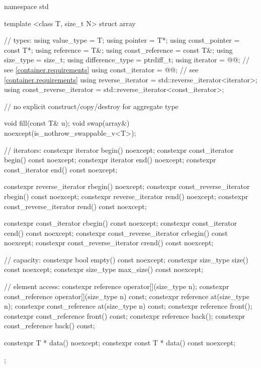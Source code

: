 %
%
%
%
%
\begin{codeblock}
namespace std {
  template <class T, size_t N>
  struct array {
    //  types:
    using value_type             = T;
    using pointer                = T*;
    using const_pointer          = const T*;
    using reference              = T&;
    using const_reference        = const T&;
    using size_type              = size_t;
    using difference_type        = ptrdiff_t;
    using iterator               = @@; // see \ref{container.requirements}
    using const_iterator         = @@; // see \ref{container.requirements}
    using reverse_iterator       = std::reverse_iterator<iterator>;
    using const_reverse_iterator = std::reverse_iterator<const_iterator>;

    // no explicit construct/copy/destroy for aggregate type

    void fill(const T& u);
    void swap(array&) noexcept(is_nothrow_swappable_v<T>);

    // iterators:
    constexpr iterator               begin() noexcept;
    constexpr const_iterator         begin() const noexcept;
    constexpr iterator               end() noexcept;
    constexpr const_iterator         end() const noexcept;

    constexpr reverse_iterator       rbegin() noexcept;
    constexpr const_reverse_iterator rbegin() const noexcept;
    constexpr reverse_iterator       rend() noexcept;
    constexpr const_reverse_iterator rend() const noexcept;

    constexpr const_iterator         cbegin() const noexcept;
    constexpr const_iterator         cend() const noexcept;
    constexpr const_reverse_iterator crbegin() const noexcept;
    constexpr const_reverse_iterator crend() const noexcept;

    // capacity:
    constexpr bool      empty() const noexcept;
    constexpr size_type size() const noexcept;
    constexpr size_type max_size() const noexcept;

    // element access:
    constexpr reference       operator[](size_type n);
    constexpr const_reference operator[](size_type n) const;
    constexpr reference       at(size_type n);
    constexpr const_reference at(size_type n) const;
    constexpr reference       front();
    constexpr const_reference front() const;
    constexpr reference       back();
    constexpr const_reference back() const;

    constexpr T *       data() noexcept;
    constexpr const T * data() const noexcept;
  };
}
\end{codeblock}

